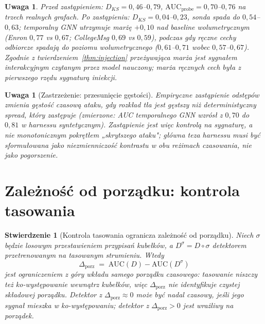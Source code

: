\documentclass[11pt]{article}
\newtheorem{proposition}[theorem]{Stwierdzenie}
\newtheorem{remark}[theorem]{Uwaga}
\begin{document}
\begin{remark}
Przed zastąpieniem: $D_{KS}=0{,}46$--$0{,}79$,
$\mathrm{AUC}_{\mathrm{probe}}=0{,}70$--$0{,}76$ na trzech realnych
grafach. Po zastąpieniu: $D_{KS}=0{,}04$--$0{,}23$, sonda spada do
$0{,}54$--$0{,}63$; temporalny GNN utrzymuje marżę $+0{,}10$ nad
baseline wolumetrycznym (Enron $0{,}77$ vs $0{,}67$; CollegeMsg
$0{,}69$ vs $0{,}59$), podczas gdy ręczne cechy odbiorcze spadają do
poziomu wolumetrycznego ($0{,}61$--$0{,}71$ wobec $0{,}57$--$0{,}67$).
Zgodnie z twierdzeniem~\ref{thm:injection} przeżywająca marża jest
sygnałem interakcyjnym czytanym przez model nauczony; marża ręcznych
cech była z pierwszego rzędu sygnaturą iniekcji.
\end{remark}

\begin{remark}[Zastrzeżenie: przesunięcie gęstości]
Empiryczne zastąpienie odstępów zmienia \emph{gęstość} czasową ataku,
gdy rozkład tła jest gęstszy niż deterministyczny spread, który
zastępuje (zmierzone: AUC temporalnego GNN \emph{wzrósł} z $0{,}70$ do
$0{,}81$ w harnessu syntetycznym). Zastąpienie jest więc kontrolą na
\emph{sygnaturę}, a nie monotonicznym pokrętłem „skrytszego ataku";
główna teza harnessu musi być sformułowana jako niezmienniczość
kontrastu w obu reżimach czasowania, nie jako pogorszenie.
\end{remark}

\section{Zależność od porządku: kontrola tasowania}
\label{sec:shuffle}

\begin{proposition}[Kontrola tasowania ogranicza zależność od porządku]
\label{prop:shuffle}
Niech $\sigma$ będzie losowym przestawieniem przypisań kubełków, a
$D^\sigma = D\circ\sigma$ detektorem przetrenowanym na tasowanym
strumieniu. Wtedy
\[
\Delta_{\mathrm{porz}} \;=\; \mathrm{AUC}(D) - \mathrm{AUC}(D^\sigma)
\]
jest \emph{ograniczeniem z góry} wkładu samego porządku czasowego:
tasowanie niszczy też ko-występowanie wewnątrz kubełków, więc
$\Delta_{\mathrm{porz}}$ nie identyfikuje czystej składowej porządku.
Detektor z $\Delta_{\mathrm{porz}}\approx0$ może być nadal czasowy, jeśli
jego sygnał mieszka w ko-występowaniu; detektor z
$\Delta_{\mathrm{porz}}>0$ jest wrażliwy na porządek.
\end{proposition}
\end{document}
